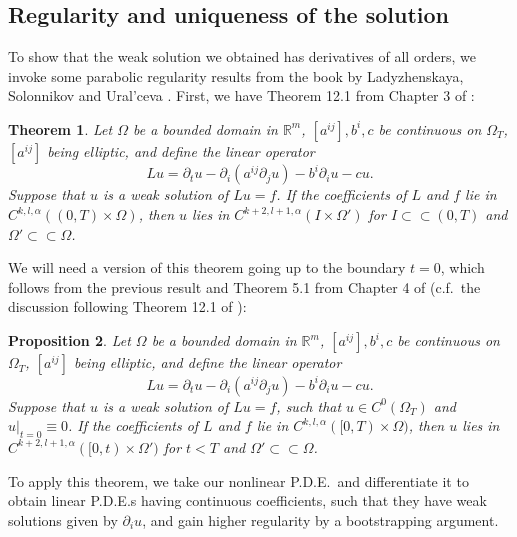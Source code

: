 \documentclass[10pt, a4paper]{article}
\theoremstyle{plain}%
\newtheorem{theorem}{Theorem}[section]
\newtheorem{prop}[theorem]{Proposition}
\theoremstyle{definition}
\numberwithin{figure}{section}
\numberwithin{equation}{section}
\begin{document}
\subsection{Regularity and
	uniqueness of the solution}
To show that the weak solution we obtained has derivatives of all orders, we invoke some parabolic regularity results from the book by Ladyzhenskaya, Solonnikov and Ural'ceva \cite{LSU68}. First, we have Theorem 12.1 from Chapter 3 of \cite{LSU68}:
\begin{theorem}\label{thm_regularity}
	Let $\Omega$ be a bounded domain in $\mathbb{R}^m$, $[a^{ij}],b^i,c$ be continuous on $\Omega_T$, $[a^{ij}]$ being elliptic, and define the linear operator \[
	Lu = \partial_t u - \partial_i(a^{ij}\partial_j u)- b^i\partial_i u - cu.
	\]
	Suppose that $u$ is a weak solution of $Lu = f$. If the coefficients of $L$ and $f$ lie in $C^{k,l,\alpha}((0,T)\times \Omega)$, then $u$ lies in $C^{k+2,l+1,\alpha}(I\times \Omega')$ for $I\subset \subset (0,T)$ and $\Omega'\subset\subset \Omega$.
\end{theorem}
We will need a version of this theorem going up to the boundary $t=0$, which follows from the previous result and Theorem 5.1 from Chapter 4 of \cite{LSU68} (c.f.\ the discussion following Theorem 12.1 of \cite{LSU68}):
\begin{prop}\label{prop_bootstrap}
	Let $\Omega$ be a bounded domain in $\mathbb{R}^m$, $[a^{ij}],b^i,c$ be continuous on $\Omega_T$, $[a^{ij}]$ being elliptic, and define the linear operator \[
	Lu = \partial_t u - \partial_i(a^{ij}\partial_j u)- b^i\partial_i u - cu.
	\]
	Suppose that $u$ is a weak solution of $Lu = f$, such that $u\in C^0(\Omega_T)$ and $u|_{t=0}\equiv0$. If the coefficients of $L$ and $f$ lie in $C^{k,l,\alpha}([0,T)\times \Omega)$, then $u$ lies in $C^{k+2,l+1,\alpha}([0,t)\times \Omega')$ for $t<T$ and $\Omega'\subset\subset \Omega$.
\end{prop}

To apply this theorem, we take our nonlinear P.D.E.\ and differentiate it to obtain linear P.D.E.s having continuous coefficients, such that they have weak solutions given by $\partial_iu$, and gain higher regularity by a bootstrapping argument. 
\end{document}
